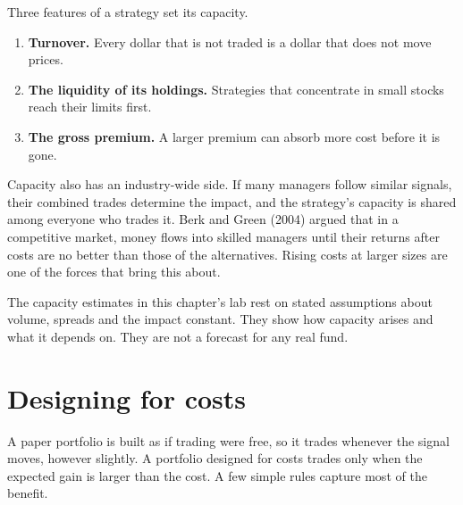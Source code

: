 Three features of a strategy set its capacity.

\begin{enumerate}
  \item \textbf{Turnover.} Every dollar that is not traded is a dollar that does not move prices.
  \item \textbf{The liquidity of its holdings.} Strategies that concentrate in small stocks reach their limits first.
  \item \textbf{The gross premium.} A larger premium can absorb more cost before it is gone.
\end{enumerate}

Capacity also has an industry-wide side. If many managers follow similar signals, their combined trades determine the impact, and the strategy's capacity is shared among everyone who trades it. Berk and Green (2004) argued that in a competitive market, money flows into skilled managers until their returns after costs are no better than those of the alternatives. Rising costs at larger sizes are one of the forces that bring this about.

The capacity estimates in this chapter's lab rest on stated assumptions about volume, spreads and the impact constant. They show how capacity arises and what it depends on. They are not a forecast for any real fund.

\section{Designing for costs}
\label{sec:04-design}

A paper portfolio is built as if trading were free, so it trades whenever the signal moves, however slightly. A portfolio designed for costs trades only when the expected gain is larger than the cost. A few simple rules capture most of the benefit.

